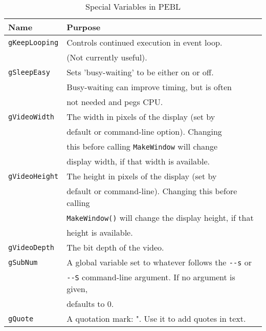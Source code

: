\begin{table}[htbp]
\caption{Special Variables in PEBL}

\begin{tabular}{ll}
\toprule
\textbf{Name}&\textbf{Purpose}\\
\midrule
\verb+gKeepLooping+ & Controls continued execution in event loop. \\
 &           (Not currently useful).\\
\addlinespace[.2cm]
\verb+gSleepEasy+      &Sets 'busy-waiting' to be either on or off.\\
                       &Busy-waiting can improve timing, but is often\\
                       &not needed and pegs CPU.   \\
\verb+gVideoWidth+  &	The width in pixels of the display (set by\\
             &  default or command-line option). Changing \\
             &  this before calling \verb+MakeWindow+ will change \\
             &  display width, if that width is available. \\
\addlinespace[.2cm]
\verb+gVideoHeight+ & 	The height in pixels of the display (set by\\
             & 	default or command-line). Changing this before calling \\
             &  \verb+MakeWindow()+ will change the display height, if that \\
             &  height is available.\\
\addlinespace[.2cm]
\verb+gVideoDepth+    &      	The bit depth of the video.\\

\addlinespace[.2cm]
\verb+gSubNum+      &  A global variable set to whatever follows the \verb+--s+ or \\
             & \verb+--S+ command-line argument.  If no argument is given, \\
             & defaults to 0.\\
\verb+gQuote+ &A quotation mark: ".  Use it to add quotes in text.\\
\bottomrule
\end{tabular}
\label{tab:special}
\end{table}






